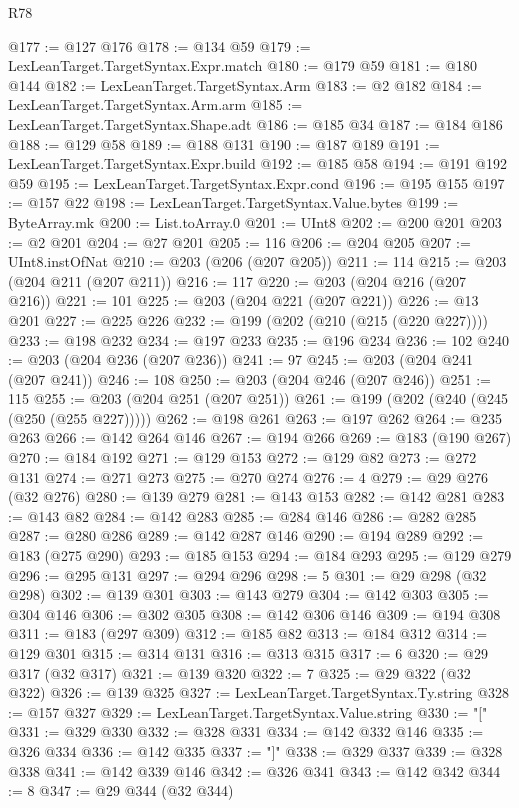 \begin{lexlean}{R78}
\begin{coremodule}
@177 := @127 @176
@178 := @134 @59
@179 := LexLeanTarget.TargetSyntax.Expr.match
@180 := @179 @59
@181 := @180 @144
@182 := LexLeanTarget.TargetSyntax.Arm
@183 := @2 @182
@184 := LexLeanTarget.TargetSyntax.Arm.arm
@185 := LexLeanTarget.TargetSyntax.Shape.adt
@186 := @185 @34
@187 := @184 @186
@188 := @129 @58
@189 := @188 @131
@190 := @187 @189
@191 := LexLeanTarget.TargetSyntax.Expr.build
@192 := @185 @58
@194 := @191 @192 @59
@195 := LexLeanTarget.TargetSyntax.Expr.cond
@196 := @195 @155
@197 := @157 @22
@198 := LexLeanTarget.TargetSyntax.Value.bytes
@199 := ByteArray.mk
@200 := List.toArray.{0}
@201 := UInt8
@202 := @200 @201
@203 := @2 @201
@204 := @27 @201
@205 := 116
@206 := @204 @205
@207 := UInt8.instOfNat
@210 := @203 (@206 (@207 @205))
@211 := 114
@215 := @203 (@204 @211 (@207 @211))
@216 := 117
@220 := @203 (@204 @216 (@207 @216))
@221 := 101
@225 := @203 (@204 @221 (@207 @221))
@226 := @13 @201
@227 := @225 @226
@232 := @199 (@202 (@210 (@215 (@220 @227))))
@233 := @198 @232
@234 := @197 @233
@235 := @196 @234
@236 := 102
@240 := @203 (@204 @236 (@207 @236))
@241 := 97
@245 := @203 (@204 @241 (@207 @241))
@246 := 108
@250 := @203 (@204 @246 (@207 @246))
@251 := 115
@255 := @203 (@204 @251 (@207 @251))
@261 := @199 (@202 (@240 (@245 (@250 (@255 @227)))))
@262 := @198 @261
@263 := @197 @262
@264 := @235 @263
@266 := @142 @264 @146
@267 := @194 @266
@269 := @183 (@190 @267)
@270 := @184 @192
@271 := @129 @153
@272 := @129 @82
@273 := @272 @131
@274 := @271 @273
@275 := @270 @274
@276 := 4
@279 := @29 @276 (@32 @276)
@280 := @139 @279
@281 := @143 @153
@282 := @142 @281
@283 := @143 @82
@284 := @142 @283
@285 := @284 @146
@286 := @282 @285
@287 := @280 @286
@289 := @142 @287 @146
@290 := @194 @289
@292 := @183 (@275 @290)
@293 := @185 @153
@294 := @184 @293
@295 := @129 @279
@296 := @295 @131
@297 := @294 @296
@298 := 5
@301 := @29 @298 (@32 @298)
@302 := @139 @301
@303 := @143 @279
@304 := @142 @303
@305 := @304 @146
@306 := @302 @305
@308 := @142 @306 @146
@309 := @194 @308
@311 := @183 (@297 @309)
@312 := @185 @82
@313 := @184 @312
@314 := @129 @301
@315 := @314 @131
@316 := @313 @315
@317 := 6
@320 := @29 @317 (@32 @317)
@321 := @139 @320
@322 := 7
@325 := @29 @322 (@32 @322)
@326 := @139 @325
@327 := LexLeanTarget.TargetSyntax.Ty.string
@328 := @157 @327
@329 := LexLeanTarget.TargetSyntax.Value.string
@330 := "["
@331 := @329 @330
@332 := @328 @331
@334 := @142 @332 @146
@335 := @326 @334
@336 := @142 @335
@337 := "]"
@338 := @329 @337
@339 := @328 @338
@341 := @142 @339 @146
@342 := @326 @341
@343 := @142 @342
@344 := 8
@347 := @29 @344 (@32 @344)

\end{coremodule}
\end{lexlean}
